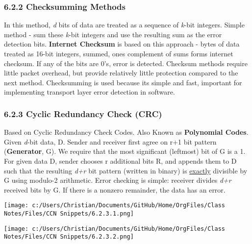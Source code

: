 \documentclass[11pt]{article}
\begin{document}
\subsubsection{6.2.2 Checksumming Methods}
\label{sec:org9d74d51}

In this method, \emph{d} bits of data are treated as a sequence of \emph{k}-bit integers. Simple method - sum these \emph{k}-bit integers and use the resulting sum as the error detection bits. \textbf{Internet Checksum} is based on this approach - bytes of data treated as 16-bit integers, summed, ones complement of sums forms internet checksum. If any of the bits are 0's, error is detected.
Checksum methods require little packet overhead, but provide relatively little protection compared to the next method. Checksumming is used because its simple and fast, important for implementing transport layer error detection in software.

\subsubsection{6.2.3 Cyclic Redundancy Check (CRC)}
\label{sec:orgd7374bd}

Based on Cyclic Redundancy Check Codes. Also Known as \textbf{Polynomial Codes}.
Given \emph{d}-bit data, D. Sender and receiver first agree on r+1 bit pattern (\textbf{Generator}, G). We require that the most significant (leftmost) bit of G is a 1.
For given data D, sender chooses r additional bits R, and appends them to D such that the resulting \emph{d+r} bit pattern (written in binary) is \uline{exactly} divisible by G using modulo-2 arithmetic.
Error checking is simple: receiver divides \emph{d+r} received bits by G. If there is a nonzero remainder, the data has an error.
\begin{figure*}
\centering
\texttt{[image: c:/Users/Christian/Documents/GitHub/Home/OrgFiles/Class Notes/Files/CCN Snippets/6.2.3.1.png]}
\bicaption{}
\end{figure*}

\begin{figure*}
\centering
\texttt{[image: c:/Users/Christian/Documents/GitHub/Home/OrgFiles/Class Notes/Files/CCN Snippets/6.2.3.2.png]}
\end{figure*}
\end{document}
